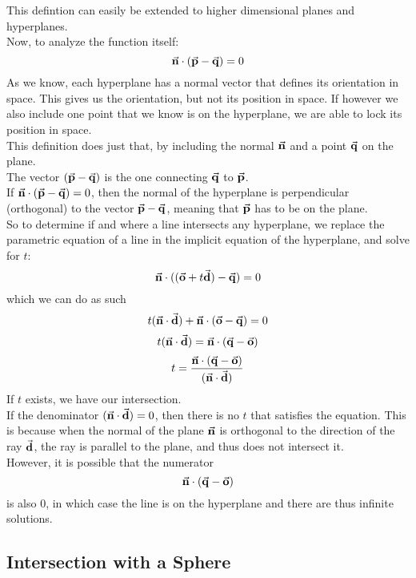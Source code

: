 \documentclass[12pt]{article}
\begin{document}
    This defintion can easily be extended
    to higher dimensional planes and hyperplanes. \\

    Now, to analyze the function itself:
    \[
        \vec{\mathbf{n}} \cdot (\vec{\mathbf{p}} - \vec{\mathbf{q}}) = 0
    \]
    As we know, each hyperplane has a normal vector that
    defines its orientation in space.
    This gives us the orientation, but not its position
    in space.
    If however we also include one point that we know
    is on the hyperplane, we are able to lock its position 
    in space. \\
    This definition does just that,
    by including the normal $\vec{\mathbf{n}}$
    and a point $\vec{\mathbf{q}}$ on the plane. \\
    The vector $(\vec{\mathbf{p}} - \vec{\mathbf{q}})$
    is the one connecting $\vec{\mathbf{q}}$ to $\vec{\mathbf{p}}$. \\
    If $\vec{\mathbf{n}} \cdot (\vec{\mathbf{p}} - \vec{\mathbf{q}}) = 0$,
    then the normal of the hyperplane
    is perpendicular (orthogonal) to the vector
    $\vec{\mathbf{p}} - \vec{\mathbf{q}}$,
    meaning that $\vec{\mathbf{p}}$ has to be on the plane. \\

    So to determine if and where a line intersects 
    any hyperplane,
    we replace the parametric equation of a line
    in the implicit equation of the hyperplane,
    and solve for $t$:
    \[
        \vec{\mathbf{n}} \cdot ((\vec{\mathbf{o}} + t\vec{\mathbf{d}}) - \vec{\mathbf{q}}) = 0
    \]
    which we can do as such
    \[
        t(\vec{\mathbf{n}} \cdot \vec{\mathbf{d}}) 
        + \vec{\mathbf{n}} \cdot (\vec{\mathbf{o}} - \vec{\mathbf{q}}) = 0
    \]
    \[
        t(\vec{\mathbf{n}} \cdot \vec{\mathbf{d}}) =
        \vec{\mathbf{n}} \cdot (\vec{\mathbf{q}} - \vec{\mathbf{o}})
    \]
    \[
        t = \dfrac  {\vec{\mathbf{n}} \cdot (\vec{\mathbf{q}} - \vec{\mathbf{o}})}
                    {(\vec{\mathbf{n}} \cdot \vec{\mathbf{d}})}
    \]
    If $t$ exists, we have our intersection. \\
    If the denominator $(\vec{\mathbf{n}} \cdot \vec{\mathbf{d}}) = 0$,
    then there is no $t$ that satisfies the equation.
    This is because when the normal of the plane $\vec{\mathbf{n}}$
    is orthogonal to the direction of the ray $\vec{\mathbf{d}}$,
    the ray is parallel to the plane,
    and thus does not intersect it. \\
    However, it is possible that the numerator
    \[\vec{\mathbf{n}} \cdot (\vec{\mathbf{q}} - \vec{\mathbf{o}})\]
    is also $0$,
    in which case the line is on the hyperplane
    and there are thus infinite solutions. \\

    \newpage

    \subsection*{Intersection with a Sphere}
    
\end{document}
